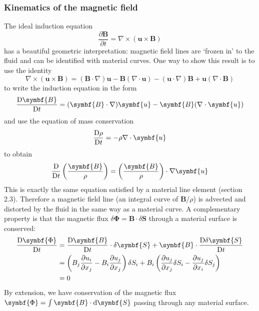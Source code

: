 \documentclass{jknotes}
\newcommand{\B}{\symbf{B}}
\renewcommand{\u}{\symbf{u}}
\newcommand{\flux}{\symbf{\Phi}}
\begin{document}
\subsubsection{Kinematics of the magnetic field}
The ideal induction equation
\begin{equation}
	\frac{\partial \symbf{B}}{\partial t} = \nabla \times (\u \times
	\B)
\end{equation}
has a beautiful geometric interpretation: magnetic field lines are `frozen in'
to the fluid and can be identified with material curves. One way to show this
result is to use the identity
\begin{equation}
	\nabla \times (\u \times \B) = (\B \cdot \nabla)\u - \B(\nabla\cdot\u) -
	(\u\cdot\nabla)\B + \u(\nabla \cdot \B)
\end{equation}
to write the induction equation in the form
\begin{equation}
	\frac{\diffD \B}{\diffD t} = (\B \cdot \nabla) \u - \B (\nabla \cdot \u)
\end{equation}
and use the equation of mass conservation
\begin{equation}
	\frac{\diffD \rho}{\diffD t} = - \rho \nabla \cdot \u
\end{equation}
to obtain
\begin{equation}
	\frac{\diffD}{\diffD t} \left( \frac{\B}{\rho}\right) =
	\left(\frac{\B}{\rho}\right)\cdot\nabla\u
\end{equation}
This is exactly the same equation satisfied by a material line element
(section 2.3). Therefore a magnetic field line (an integral curve of
$\B/\rho$) is advected and distorted by the fluid in the same way as a
material curve. A complementary property is that the magnetic flux $\delta
\flux = \B \cdot \delta\symbf{S}$ through a material surface is conserved:
\begin{align}
	\frac{\diffD \flux}{\diffD t} &= \frac{\diffD \B}{\diffD t} \cdot \delta
	\symbf{S} + \B \cdot \frac{\diffD \delta \symbf{S}}{\diffD t} \\ 
								  &= \left( B_j \frac{\partial u_i}{\partial
								  x_j} - B_i \frac{\partial u_j}{\partial x_j}
								  \right) \delta S_i + B_i \left(
								  \frac{\partial u_j}{\partial x_j} \delta S_i
								  - \frac{\partial u_j}{\partial x_i} \delta
								  S_j\right) \\
								  &= 0
\end{align}
By extension, we have conservation of the magnetic flux $\flux = \int \B \cdot
\diffd \symbf{S}$ passing through any material surface.
\end{document}
